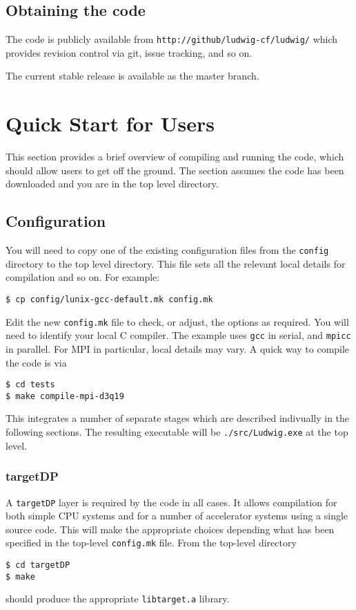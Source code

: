 \subsection{Obtaining the code}

The code is publicly available from
\texttt{http://github/ludwig-cf/ludwig/}
which provides revision control via git, issue tracking, and so on.

The current stable release is available as the master branch.


\vfill
\pagebreak

\section{Quick Start for Users}

This section provides a brief overview of compiling and running
the code, which should allow users to get off the ground.
The section assumes the code has been downloaded and you are in the
top level directory.

\subsection{Configuration}

You will need to copy one of the existing configuration files from
the \texttt{config} directory to the top level directory. This file
sets all the relevant local details for compilation and so on. For
example:
\begin{lstlisting}
$ cp config/lunix-gcc-default.mk config.mk
\end{lstlisting}
Edit the new \texttt{config.mk} file to check, or adjust, the options
as required. You will need to identify your local C compiler. The
example uses \texttt{gcc}
in serial, and \texttt{mpicc} in parallel. For MPI in particular,
local details may vary. A quick way to compile the code is via
\begin{lstlisting}
$ cd tests
$ make compile-mpi-d3q19
\end{lstlisting}
This integrates a number of separate stages which are described
indivually in the following sections. The resulting executable
will be \texttt{./src/Ludwig.exe} at the top level.

\subsubsection{targetDP}

A \texttt{targetDP} layer is required by the code in all cases. It
allows compilation for both simple CPU systems and
for a number of accelerator systems using a single source code. This
will make the appropriate choices depending what has been specified
in the top-level \texttt{config.mk} file. From the top-level directory
\begin{lstlisting}
$ cd targetDP
$ make
\end{lstlisting}
should produce the appropriate \texttt{libtarget.a} library.

